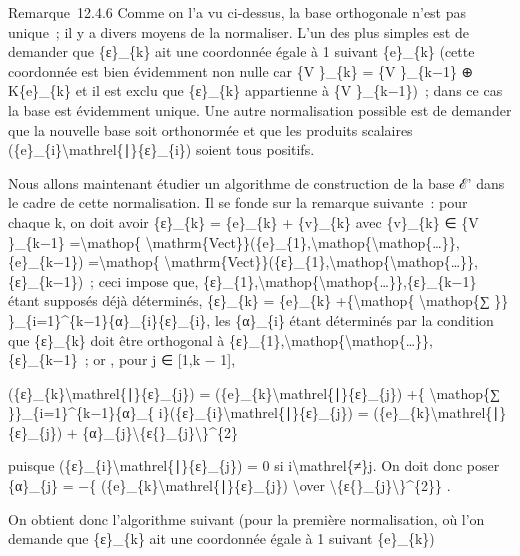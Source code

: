 \documentclass[]{article}
\begin{document}
Remarque~12.4.6 Comme on l'a vu ci-dessus, la base orthogonale n'est pas
unique~; il y a divers moyens de la normaliser. L'un des plus simples
est de demander que \{ε\}\_\{k\} ait une coordonnée égale à 1 suivant
\{e\}\_\{k\} (cette coordonnée est bien évidemment non nulle car \{V
\}\_\{k\} = \{V \}\_\{k−1\} ⊕ K\{e\}\_\{k\} et il est exclu que
\{ε\}\_\{k\} appartienne à \{V \}\_\{k−1\})~; dans ce cas la base est
évidemment unique. Une autre normalisation possible est de demander que
la nouvelle base soit orthonormée et que les produits scalaires
(\{e\}\_\{i\}\textbackslash{}mathrel\{∣\}\{ε\}\_\{i\}) soient tous
positifs.

Nous allons maintenant étudier un algorithme de construction de la base
ℰ' dans le cadre de cette normalisation. Il se fonde sur la remarque
suivante~: pour chaque k, on doit avoir \{ε\}\_\{k\} = \{e\}\_\{k\} +
\{v\}\_\{k\} avec \{v\}\_\{k\} ∈ \{V \}\_\{k−1\}
=\textbackslash{}mathop\{
\textbackslash{}mathrm\{Vect\}\}(\{e\}\_\{1\},\textbackslash{}mathop\{\textbackslash{}mathop\{\ldots{}\}\},\{e\}\_\{k−1\})
=\textbackslash{}mathop\{
\textbackslash{}mathrm\{Vect\}\}(\{ε\}\_\{1\},\textbackslash{}mathop\{\textbackslash{}mathop\{\ldots{}\}\},\{ε\}\_\{k−1\})~;
ceci impose que,
\{ε\}\_\{1\},\textbackslash{}mathop\{\textbackslash{}mathop\{\ldots{}\}\},\{ε\}\_\{k−1\}
étant supposés déjà déterminés, \{ε\}\_\{k\} = \{e\}\_\{k\}
+\{\textbackslash{}mathop\{ \textbackslash{}mathop\{∑ \}\}
\}\_\{i=1\}\^{}\{k−1\}\{α\}\_\{i\}\{ε\}\_\{i\}, les \{α\}\_\{i\} étant
déterminés par la condition que \{ε\}\_\{k\} doit être orthogonal à
\{ε\}\_\{1\},\textbackslash{}mathop\{\textbackslash{}mathop\{\ldots{}\}\},\{ε\}\_\{k−1\}~;
or , pour j ∈ {[}1,k − 1{]},

(\{ε\}\_\{k\}\textbackslash{}mathrel\{∣\}\{ε\}\_\{j\}) =
(\{e\}\_\{k\}\textbackslash{}mathrel\{∣\}\{ε\}\_\{j\}) +\{
\textbackslash{}mathop\{∑ \}\}\_\{i=1\}\^{}\{k−1\}\{α\}\_\{
i\}(\{ε\}\_\{i\}\textbackslash{}mathrel\{∣\}\{ε\}\_\{j\}) =
(\{e\}\_\{k\}\textbackslash{}mathrel\{∣\}\{ε\}\_\{j\}) +
\{α\}\_\{j\}\textbackslash{}\textbar{}\{ε\{\}\_\{j\}\textbackslash{}\textbar{}\}\^{}\{2\}

puisque (\{ε\}\_\{i\}\textbackslash{}mathrel\{∣\}\{ε\}\_\{j\}) = 0 si
i\textbackslash{}mathrel\{≠\}j. On doit donc poser \{α\}\_\{j\} = −\{
(\{e\}\_\{k\}\textbackslash{}mathrel\{∣\}\{ε\}\_\{j\})
\textbackslash{}over
\textbackslash{}\textbar{}\{ε\{\}\_\{j\}\textbackslash{}\textbar{}\}\^{}\{2\}\}
.

On obtient donc l'algorithme suivant (pour la première normalisation, où
l'on demande que \{ε\}\_\{k\} ait une coordonnée égale à 1 suivant
\{e\}\_\{k\})
\end{document}

